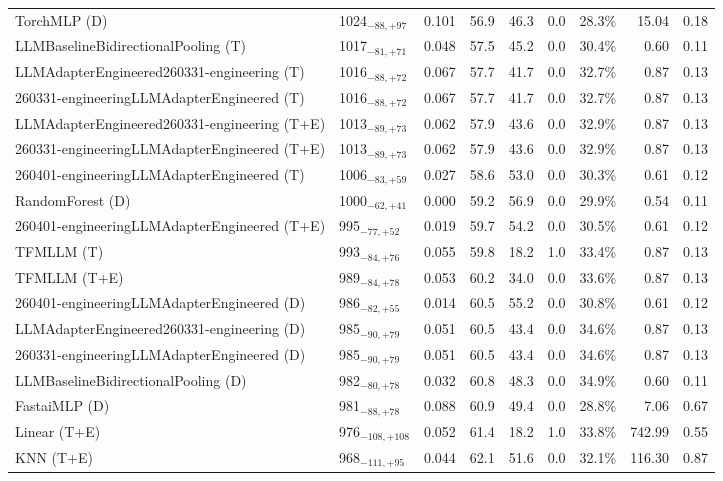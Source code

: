 \begin{tabular}{llcccccrr}
TorchMLP (D) & 1024${}_{-88,+97}$ & 0.101 & 56.9 & 46.3 & 0.0 & 28.3\% & 15.04 & 0.18 \\
LLMBaselineBidirectionalPooling (T) & 1017${}_{-81,+71}$ & 0.048 & 57.5 & 45.2 & 0.0 & 30.4\% & 0.60 & 0.11 \\
LLMAdapterEngineered260331-engineering (T) & 1016${}_{-88,+72}$ & 0.067 & 57.7 & 41.7 & 0.0 & 32.7\% & 0.87 & 0.13 \\
260331-engineeringLLMAdapterEngineered (T) & 1016${}_{-88,+72}$ & 0.067 & 57.7 & 41.7 & 0.0 & 32.7\% & 0.87 & 0.13 \\
LLMAdapterEngineered260331-engineering (T+E) & 1013${}_{-89,+73}$ & 0.062 & 57.9 & 43.6 & 0.0 & 32.9\% & 0.87 & 0.13 \\
260331-engineeringLLMAdapterEngineered (T+E) & 1013${}_{-89,+73}$ & 0.062 & 57.9 & 43.6 & 0.0 & 32.9\% & 0.87 & 0.13 \\
260401-engineeringLLMAdapterEngineered (T) & 1006${}_{-83,+59}$ & 0.027 & 58.6 & 53.0 & 0.0 & 30.3\% & 0.61 & 0.12 \\
RandomForest (D) & 1000${}_{-62,+41}$ & 0.000 & 59.2 & 56.9 & 0.0 & 29.9\% & 0.54 & 0.11 \\
260401-engineeringLLMAdapterEngineered (T+E) & 995${}_{-77,+52}$ & 0.019 & 59.7 & 54.2 & 0.0 & 30.5\% & 0.61 & 0.12 \\
TFMLLM (T) & 993${}_{-84,+76}$ & 0.055 & 59.8 & 18.2 & 1.0 & 33.4\% & 0.87 & 0.13 \\
TFMLLM (T+E) & 989${}_{-84,+78}$ & 0.053 & 60.2 & 34.0 & 0.0 & 33.6\% & 0.87 & 0.13 \\
260401-engineeringLLMAdapterEngineered (D) & 986${}_{-82,+55}$ & 0.014 & 60.5 & 55.2 & 0.0 & 30.8\% & 0.61 & 0.12 \\
LLMAdapterEngineered260331-engineering (D) & 985${}_{-90,+79}$ & 0.051 & 60.5 & 43.4 & 0.0 & 34.6\% & 0.87 & 0.13 \\
260331-engineeringLLMAdapterEngineered (D) & 985${}_{-90,+79}$ & 0.051 & 60.5 & 43.4 & 0.0 & 34.6\% & 0.87 & 0.13 \\
LLMBaselineBidirectionalPooling (D) & 982${}_{-80,+78}$ & 0.032 & 60.8 & 48.3 & 0.0 & 34.9\% & 0.60 & 0.11 \\
FastaiMLP (D) & 981${}_{-88,+78}$ & 0.088 & 60.9 & 49.4 & 0.0 & 28.8\% & 7.06 & 0.67 \\
Linear (T+E) & 976${}_{-108,+108}$ & 0.052 & 61.4 & 18.2 & 1.0 & 33.8\% & 742.99 & 0.55 \\
KNN (T+E) & 968${}_{-111,+95}$ & 0.044 & 62.1 & 51.6 & 0.0 & 32.1\% & 116.30 & 0.87 \\

\end{tabular}

